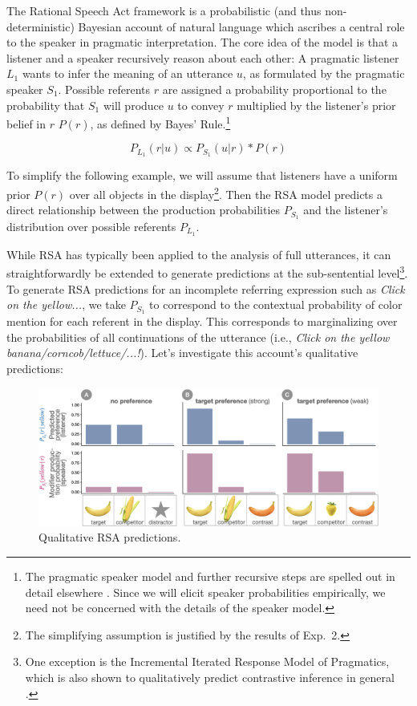 \documentclass[a4paper,man,floatsintext,natbib]{apa6}
\begin{document}
The Rational Speech Act framework \citep{Frank:2012,Goodman:2016} is a probabilistic (and thus non-deterministic) Bayesian account of natural language which ascribes a central role to the speaker in pragmatic interpretation. The core idea of the model is that a listener and a speaker recursively reason about each other: A pragmatic listener $L_1$ wants to infer the meaning of an utterance $u$, as formulated by the pragmatic speaker $S_1$. Possible referents $r$ are assigned a probability proportional to the probability that $S_1$ will produce $u$ to convey $r$ multiplied by the listener's prior belief in $r$ $P(r)$, as defined by Bayes' Rule.\footnote{The pragmatic speaker model and further recursive steps are spelled out in detail elsewhere \citep{Goodman:2016}. Since we will elicit speaker probabilities empirically, we need not be concerned with the details of the speaker model.}

\begin{equation}
	P_{L_1}(r|u) \propto P_{S_1}(u|r) * P(r)
\label{eq-prior}
\end{equation}

To simplify the following example, we will assume that listeners have a uniform prior $P(r)$ over all objects in the display\footnote{The simplifying assumption is justified by the results of Exp.~2.}. Then the RSA model predicts a direct relationship between the production probabilities $P_{S_1}$ and the listener's distribution over possible referents $P_{L_1}$.

While RSA has typically been applied to the analysis of full utterances, it can straightforwardly be extended to generate predictions at the sub-sentential level\footnote{One exception is the Incremental Iterated Response Model of Pragmatics, which is also shown to qualitatively predict contrastive inference in general \cite{Cohn-Gordon:2019}.}. To generate RSA predictions for an incomplete referring expression such as \textit{Click on the yellow...}, we take $P_{S_1}$ to correspond to the contextual probability of color mention for each referent in the display. This corresponds to marginalizing over the probabilities of all continuations of the utterance (i.e., \textit{Click on the yellow banana/corncob/lettuce/...!}). Let's investigate this account's qualitative predictions:

\begin{figure}
	\begin{center}
		\includegraphics[width=1\textwidth]{img/rsa-example.png}
	\end{center}
\caption{Qualitative RSA predictions.} 
\label{rsa-example}
\end{figure}
\end{document}
